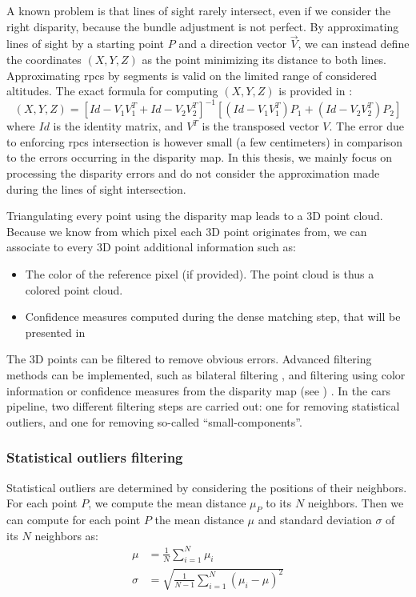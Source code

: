 A known problem is that lines of sight rarely intersect, even if we consider the right disparity, because the bundle adjustment is not perfect. By approximating lines of sight by a starting point $P$ and a direction vector $\overrightarrow{V}$, we can instead define the coordinates $(X,Y,Z)$ as the point minimizing its distance to both lines. Approximating \acrshort{rpc}s by segments is valid on the limited range of considered altitudes. The exact formula for computing $(X,Y,Z)$ is provided in \cite{delvit_geometric_2006}:
\begin{equation}
    (X,Y,Z) = \left[ Id - V_1V_1^T + Id - V_2V_2^T \right]^{-1} \left[ (Id - V_1V_1^T)P_1 + (Id - V_2V_2^T)P_2 \right]
\end{equation}
where $Id$ is the identity matrix, and $V^T$ is the transposed vector $V$. The error due to enforcing \acrshort{rpc}s  intersection is however small (a few centimeters) in comparison to the errors occurring in the disparity map. In this thesis, we mainly focus on processing the disparity errors and do not consider the approximation made during the lines of sight intersection.

Triangulating every point using the disparity map leads to a 3D point cloud. Because we know from which pixel each 3D point originates from, we can associate to every 3D point additional information such as:
\begin{itemize}
    \item The color of the reference pixel (if provided). The point cloud is thus a colored point cloud.
    \item Confidence measures computed during the dense matching step, that will be presented in 
\end{itemize}

The 3D points can be filtered to remove obvious errors. Advanced filtering methods can be implemented, such as bilateral filtering \cite{digne_bilateral_2017}, and filtering using color information or confidence measures from the disparity map (see ) \cite{youssefi_geometrically_2024}. In the \acrshort{cars} pipeline, two different filtering steps are carried out: one for removing statistical outliers, and one for removing so-called ``small-components''.

\subsubsection{Statistical outliers filtering}
Statistical outliers are determined by considering the positions of their neighbors. For each point $P$, we compute the mean distance $\mu_P$ to its $N$ neighbors. Then we can compute for each point $P$ the mean distance $\mu$ and standard deviation $\sigma$ of its $N$ neighbors as:
\begin{align}
    \mu &= \frac{1}{N}\sum_{i=1}^N\mu_i\\
    \sigma &= \sqrt{\frac{1}{N-1}\sum_{i=1}^N(\mu_i-\mu)^2}
\end{align}

